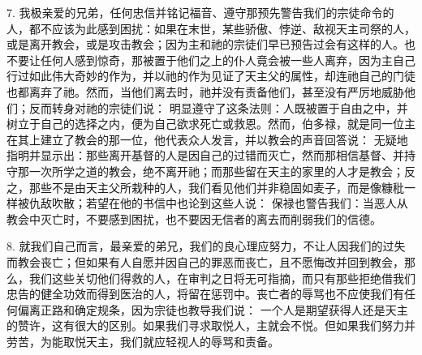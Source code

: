 7. 我极亲爱的兄弟，任何忠信并铭记福音、遵守那预先警告我们的宗徒命令的人，都不应该为此感到困扰：如果在末世，某些骄傲、悖逆、敌视天主司祭的人，或是离开教会，或是攻击教会；因为主和祂的宗徒们早已预告过会有这样的人。也不要让任何人感到惊奇，那被置于他们之上的仆人竟会被一些人离弃，因为主自己行过如此伟大奇妙的作为，并以祂的作为见证了天主父的属性，却连祂自己的门徒也都离弃了祂。然而，当他们离去时，祂并没有责备他们，甚至没有严厉地威胁他们；反而转身对祂的宗徒们说： 明显遵守了这条法则：人既被置于自由之中，并树立于自己的选择之内，便为自己欲求死亡或救恩。然而，伯多禄，就是同一位主在其上建立了教会的那一位，他代表众人发言，并以教会的声音回答说： 无疑地指明并显示出：那些离开基督的人是因自己的过错而灭亡，然而那相信基督、并持守那一次所学之道的教会，绝不离开祂；而那些留在天主的家里的人才是教会；反之，那些不是由天主父所栽种的人，我们看见他们并非稳固如麦子，而是像糠秕一样被仇敌吹散；若望在他的书信中也论到这些人说： 保禄也警告我们：当恶人从教会中灭亡时，不要感到困扰，也不要因无信者的离去而削弱我们的信德。\par

8. 就我们自己而言，最亲爱的弟兄，我们的良心理应努力，不让人因我们的过失而教会丧亡；但如果有人自愿并因自己的罪恶而丧亡，且不愿悔改并回到教会，那么，我们这些关切他们得救的人，在审判之日将无可指摘，而只有那些拒绝借我们忠告的健全功效而得到医治的人，将留在惩罚中。丧亡者的辱骂也不应使我们有任何偏离正路和确定规条，因为宗徒也教导我们说： 一个人是期望获得人还是天主的赞许，这有很大的区别。如果我们寻求取悦人，主就会不悦。但如果我们努力并劳苦，为能取悦天主，我们就应轻视人的辱骂和责备。\par

